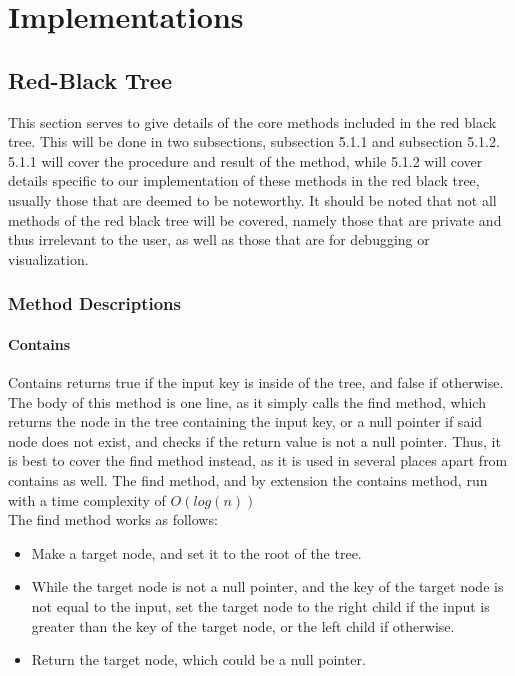 \documentclass{article}
\begin{document}
\section{Implementations}
\subsection{Red-Black Tree}


\noindent
This section serves to give details of the core methods included in the red black tree. This will be done in two subsections, subsection 5.1.1 and subsection 5.1.2. 5.1.1 will cover the procedure and result of the method, while 5.1.2 will cover details specific to our implementation of these methods in the red black tree, usually those that are deemed to be noteworthy. It should be noted that not all methods of the red black tree will be covered, namely those that are private and thus irrelevant to the user, as well as those that are for debugging or visualization.
\\

\subsubsection{Method Descriptions}

\paragraph{Contains}

\noindent
Contains returns true if the input key is inside of the tree, and false if otherwise. The body of this method is one line, as it simply calls the find method, which returns the node in the tree containing the input key, or a null pointer if said node does not exist, and checks if the return value is not a null pointer. Thus, it is best to cover the find method instead, as it is used in several places apart from contains as well. The find method, and by extension the contains method, run with a time complexity of $O(log(n))$
\\

\noindent
The find method works as follows:

\begin{itemize}
    \item Make a target node, and set it to the root of the tree.
    \item While the target node is not a null pointer, and the key of the target node is not equal to the input, set the target node to the right child if the input is greater than the key of the target node, or the left child if otherwise.
    \item Return the target node, which could be a null pointer.
\end{itemize}
\end{document}
